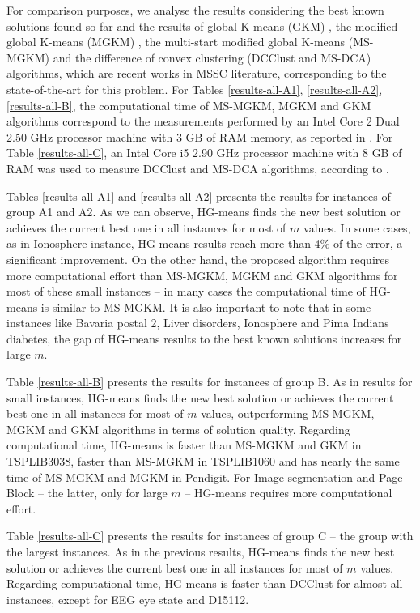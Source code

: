 For comparison purposes, we analyse the results considering the best known solutions found so far and the results of global K-means (GKM) \cite{Likas2003}, the modified global K-means (MGKM) \cite{Bagirov2008}, the multi-start modified global K-means (MS-MGKM) \cite{Ordin2014} and the difference of convex clustering (DCClust and MS-DCA) \cite{Bagirov2016} algorithms, which are recent works in MSSC literature, corresponding to the state-of-the-art for this problem. For Tables \ref{results-all-A1}, \ref{results-all-A2}, \ref{results-all-B}, the computational time of MS-MGKM, MGKM and GKM algorithms correspond to the measurements performed by an Intel Core 2 Dual 2.50 GHz processor machine with 3 GB of RAM memory, as reported in \cite{Ordin2014}. For Table \ref{results-all-C}, an Intel Core i5 2.90 GHz processor machine with 8 GB of RAM was used to measure DCClust and MS-DCA algorithms, according to \cite{Bagirov2016}.

Tables \ref{results-all-A1} and \ref{results-all-A2} presents the results for instances of group A1 and A2. As we can observe, HG-means finds the new best solution or achieves the current best one in all instances for most of $m$ values. In some cases, as in Ionosphere instance, HG-means results reach more than 4\% of the error, a significant improvement. On the other hand, the proposed algorithm requires more computational effort than MS-MGKM, MGKM and GKM algorithms for most of these small instances -- in many cases the computational time of HG-means is similar to MS-MGKM. It is also important to note that in some instances like Bavaria postal 2, Liver disorders, Ionosphere and Pima Indians diabetes, the gap of HG-means results to the best known solutions increases for large $m$.

Table \ref{results-all-B} presents the results for instances of group B. As in results for small instances, HG-means finds the new best solution or achieves the current best one in all instances for most of $m$ values, outperforming MS-MGKM, MGKM and GKM algorithms in terms of solution quality. Regarding computational time, HG-means is faster than MS-MGKM and GKM in TSPLIB3038, faster than MS-MGKM in TSPLIB1060 and has nearly the same time of MS-MGKM and MGKM in Pendigit. For Image segmentation and Page Block -- the latter, only for large $m$ -- HG-means requires more computational effort.

Table \ref{results-all-C} presents the results for instances of group C -- the group with the largest instances. As in the previous results, HG-means finds the new best solution or achieves the current best one in all instances for most of $m$ values. Regarding computational time, HG-means is faster than DCClust for almost all instances, except for EEG eye state and D15112.

